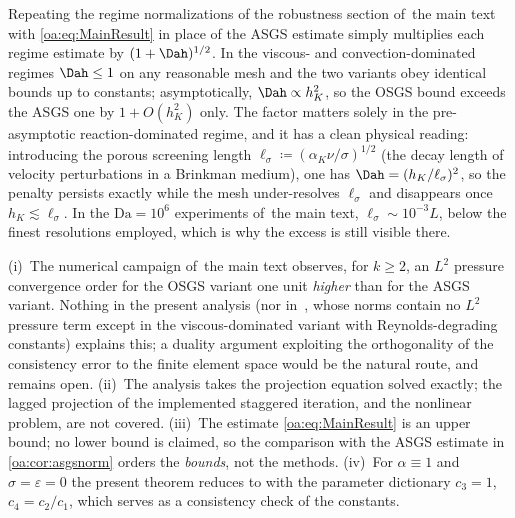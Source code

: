 \begin{remark}
\label{oa:rem:robustness}
Repeating the regime normalizations of the robustness section of~the main text
with \cref{oa:eq:MainResult} in place of the ASGS estimate simply multiplies each regime
estimate by $(1+\Dah)^{1/2}$. In the viscous- and convection-dominated regimes
$\Dah \le 1$ on any reasonable mesh and the two variants obey identical bounds up to
constants; asymptotically, $\Dah \propto h_K^2$, so the OSGS bound exceeds the ASGS
one by $1 + O(h_K^2)$ only. The factor matters solely in the pre-asymptotic
reaction-dominated regime, and it has a clean physical reading: introducing the
porous screening length $\ell_\sigma \coloneqq (\alpha_K\nu/\sigma)^{1/2}$ (the decay
length of velocity perturbations in a Brinkman medium), one has
$\Dah = (h_K/\ell_\sigma)^2$, so the penalty persists exactly while the mesh
under-resolves $\ell_\sigma$ and disappears once $h_K \lesssim \ell_\sigma$. In the
$\mathrm{Da} = 10^6$ experiments of~the main text, $\ell_\sigma \sim 10^{-3}L$,
below the finest resolutions employed, which is why the excess is still visible there.
\end{remark}

\begin{remark}
\label{oa:rem:open}
(i)~The numerical campaign of~the main text observes, for $k \ge 2$, an $L^2$
pressure convergence order for the OSGS variant one unit \emph{higher} than for the
ASGS variant. Nothing in the present analysis (nor in~\cite{codina2008analysis}, whose norms
contain no $L^2$ pressure term except in the viscous-dominated variant with
Reynolds-degrading constants) explains this; a duality argument exploiting the
orthogonality of the consistency error to the finite element space would be the
natural route, and remains open. (ii)~The analysis takes the projection equation
solved exactly; the lagged projection of the implemented staggered iteration, and the
nonlinear problem, are not covered. (iii)~The estimate \cref{oa:eq:MainResult} is an
upper bound; no lower bound is claimed, so the comparison with the ASGS estimate in
\cref{oa:cor:asgsnorm} orders the \emph{bounds}, not the methods. (iv)~For $\alpha \equiv 1$
and $\sigma = \varepsilon = 0$ the present theorem reduces to
\cite[Theorem~2]{codina2008analysis} with the parameter dictionary $c_3 = 1$,
$c_4 = c_2/c_1$, which serves as a consistency check of the constants.
\end{remark}


